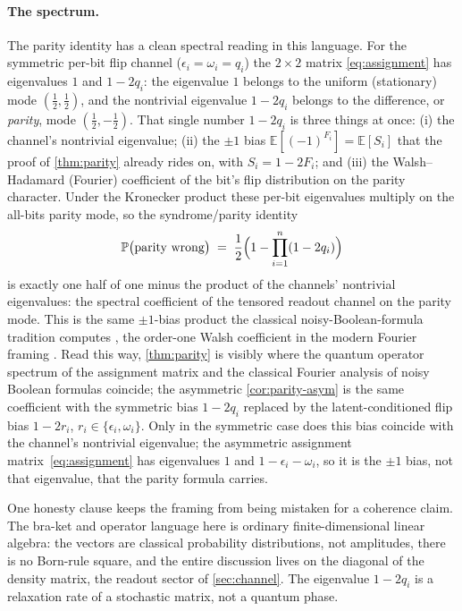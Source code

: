 \documentclass[12pt]{article}
\numberwithin{equation}{section}
\theoremstyle{plain}
\theoremstyle{definition}
\theoremstyle{remark}
\newcommand{\eps}{\epsilon}
\newcommand{\Prob}{\mathbb{P}}
\begin{document}
\paragraph{The spectrum.} The parity identity has a clean spectral reading in
this language. For the symmetric per-bit flip channel ($\eps_i=\omega_i=q_i$) the
$2\times2$ matrix \eqref{eq:assignment} has eigenvalues $1$ and $1-2q_i$: the
eigenvalue $1$ belongs to the uniform (stationary) mode $(\tfrac12,\tfrac12)$,
and the nontrivial eigenvalue $1-2q_i$ belongs to the difference, or
\emph{parity}, mode $(\tfrac12,-\tfrac12)$. That single number $1-2q_i$ is three
things at once: (i) the channel's nontrivial eigenvalue; (ii) the $\pm1$ bias
$\mathbb{E}[(-1)^{F_i}]=\mathbb{E}[S_i]$ that the proof of \cref{thm:parity}
already rides on, with $S_i=1-2F_i$; and (iii) the Walsh--Hadamard (Fourier)
coefficient of the bit's flip distribution on the parity character. Under the
Kronecker product these per-bit eigenvalues multiply on the all-bits parity mode,
so the syndrome/parity identity
\begin{equation}
\label{eq:parity-spectral}
  \Prob\bigl(\text{parity wrong}\bigr)
  \;=\; \frac12\Bigl(1 - \prod_{i=1}^{n}(1-2q_i)\Bigr)
\end{equation}
is exactly one half of one minus the product of the channels' nontrivial
eigenvalues: the spectral coefficient of the tensored readout channel on the
parity mode. This is the same $\pm1$-bias product the classical
noisy-Boolean-formula tradition computes \citep{vonneumann1956,pippenger1988},
the order-one Walsh coefficient in the modern Fourier framing \citep{odonnell2014}.
Read this way, \cref{thm:parity} is visibly where the quantum operator spectrum
of the assignment matrix and the classical Fourier analysis of noisy Boolean
formulas coincide; the asymmetric \cref{cor:parity-asym} is the same coefficient
with the symmetric bias $1-2q_i$ replaced by the latent-conditioned flip bias
$1-2r_i$, $r_i\in\{\eps_i,\omega_i\}$. Only in the symmetric case does this bias
coincide with the channel's nontrivial eigenvalue; the asymmetric assignment
matrix~\eqref{eq:assignment} has eigenvalues $1$ and $1-\eps_i-\omega_i$, so it
is the $\pm1$ bias, not that eigenvalue, that the parity formula carries.

One honesty clause keeps the framing from being mistaken for a coherence claim.
The bra-ket and operator language here is ordinary finite-dimensional linear
algebra: the vectors are classical probability distributions, not amplitudes,
there is no Born-rule square, and the entire discussion lives on the diagonal of
the density matrix, the readout sector of \cref{sec:channel}. The eigenvalue
$1-2q_i$ is a relaxation rate of a stochastic matrix, not a quantum phase.
\end{document}
